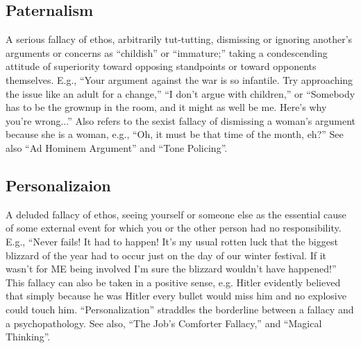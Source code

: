 \documentclass[10pt,a4paper,british]{article}
\begin{document}
\begin{multicols}{2}
    \subsection{Paternalism} A serious fallacy of ethos, arbitrarily
    tut{-}tutting, dismissing or ignoring another's arguments or concerns as
    ``childish'' or ``immature;'' taking a condescending attitude of superiority
    toward opposing standpoints or toward opponents themselves. E.g., ``Your
    argument against the war is so infantile. Try approaching the issue like an
    adult for a change,'' ``I don't argue with children,'' or ``Somebody has to
    be the grownup in the room, and it might as well be me. Here's why you're
    wrong...''  Also refers to the sexist fallacy of dismissing a woman's
    argument because she is a woman, e.g., ``Oh, it must be that time of the
    month, eh?'' See also ``Ad Hominem Argument'' and ``Tone Policing''.

    \subsection{Personalizaion} A deluded fallacy of ethos, seeing yourself or
    someone else as the essential cause of some external event for which you or
    the other person had no responsibility. E.g., ``Never fails! It had to
    happen! It's my usual rotten luck that the biggest blizzard of the year had
    to occur just on the day of our winter festival. If it wasn't for ME being
    involved I'm sure the blizzard wouldn't have happened!'' This fallacy can
    also be taken in a positive sense, e.g. Hitler evidently believed that
    simply because he was Hitler every bullet would miss him and no explosive
    could touch him. ``Personalization'' straddles the borderline between a
    fallacy and a psychopathology. See also, ``The Job's Comforter Fallacy,''
    and ``Magical Thinking''.


\end{multicols}
\end{document}

